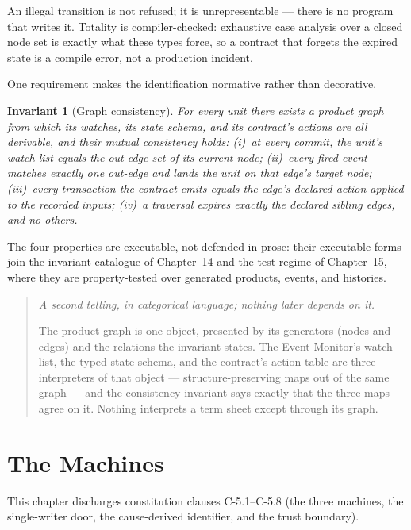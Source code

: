 \documentclass[11pt,a4paper]{article}
\newtheorem{invariant}[definition]{Invariant}
\newenvironment{secondtelling}%
  {\par\medskip\noindent\begin{quote}\small\emph{A second telling, in categorical language; nothing later depends on it.}\par\smallskip}%
  {\end{quote}\medskip}
\begin{document}
An illegal transition is not refused; it is unrepresentable --- there is no program that
writes it. Totality is compiler-checked: exhaustive case analysis over a closed node set
is exactly what these types force, so a contract that forgets the expired state is a
compile error, not a production incident.

One requirement makes the identification normative rather than decorative.

\begin{invariant}[Graph consistency]\label{inv:graph-consistency}
For every unit there exists a product graph from which its watches, its state schema,
and its contract's actions are all derivable, and their mutual consistency holds:
(i)~at every commit, the unit's watch list equals the out-edge set of its current node;
(ii)~every fired event matches exactly one out-edge and lands the unit on that edge's
target node;
(iii)~every transaction the contract emits equals the edge's declared action applied to
the recorded inputs;
(iv)~a traversal expires exactly the declared sibling edges, and no others.
\end{invariant}

The four properties are executable, not defended in prose: their executable forms join
the invariant catalogue of Chapter~14 and the test regime of Chapter~15, where they are
property-tested over generated products, events, and histories.

\begin{secondtelling}
The product graph is one object, presented by its generators (nodes and edges) and the
relations the invariant states. The Event Monitor's watch list, the typed state schema,
and the contract's action table are three interpreters of that object ---
structure-preserving maps out of the same graph --- and the consistency invariant says
exactly that the three maps agree on it. Nothing interprets a term sheet except through
its graph.
\end{secondtelling}

\section{The Machines}\label{ch:machines}

This chapter discharges constitution clauses C-5.1--C-5.8 (the three machines, the single-writer door, the cause-derived identifier, and the trust boundary).
\end{document}
